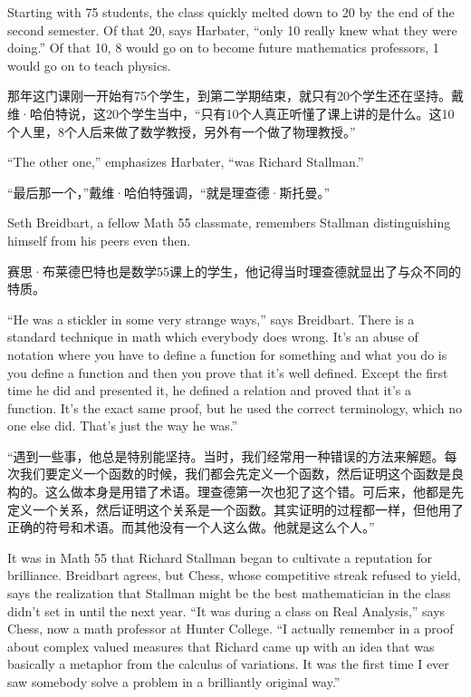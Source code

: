 \ifdefined\eng
Starting with 75 students, the class quickly melted down to 20 by the end of the second semester. Of that 20, says Harbater, ``only 10 really knew what they were doing.'' Of that 10, 8 would go on to become future mathematics professors, 1 would go on to teach physics.
\fi

\ifdefined\chs
那年这门课刚一开始有75个学生，到第二学期结束，就只有20个学生还在坚持。戴维·哈伯特说，这20个学生当中，``只有10个人真正听懂了课上讲的是什么。这10个人里，8个人后来做了数学教授，另外有一个做了物理教授。''
\fi

\ifdefined\eng
``The other one,'' emphasizes Harbater, ``was Richard Stallman.''
\fi

\ifdefined\chs
``最后那一个，''戴维·哈伯特强调，``就是理查德·斯托曼。''
\fi

\ifdefined\eng
Seth Breidbart, a fellow Math 55 classmate, remembers Stallman distinguishing himself from his peers even then.
\fi

\ifdefined\chs
赛思·布莱德巴特也是数学55课上的学生，他记得当时理查德就显出了与众不同的特质。
\fi

\ifdefined\eng
``He was a stickler in some very strange ways,'' says Breidbart. There is a standard technique in math which everybody does wrong. It's an abuse of notation where you have to define a function for something and what you do is you define a function and then you prove that it's well defined. Except the first time he did and presented it, he defined a relation and proved that it's a function. It's the exact same proof, but he used the correct terminology, which no one else did. That's just the way he was.''
\fi

\ifdefined\chs
``遇到一些事，他总是特别能坚持。当时，我们经常用一种错误的方法来解题。每次我们要定义一个函数的时候，我们都会先定义一个函数，然后证明这个函数是良构的。这么做本身是用错了术语。理查德第一次也犯了这个错。可后来，他都是先定义一个关系，然后证明这个关系是一个函数。其实证明的过程都一样，但他用了正确的符号和术语。而其他没有一个人这么做。他就是这么个人。''
\fi

\ifdefined\eng
It was in Math 55 that Richard Stallman began to cultivate a reputation for brilliance. Breidbart agrees, but Chess, whose competitive streak refused to yield, says the realization that Stallman might be the best mathematician in the class didn't set in until the next year. ``It was during a class on Real Analysis,'' says Chess, now a math professor at Hunter College. ``I actually remember in a proof about complex valued measures that Richard came up with an idea that was basically a metaphor from the calculus of variations. It was the first time I ever saw somebody solve a problem in a brilliantly original way.''
\fi

